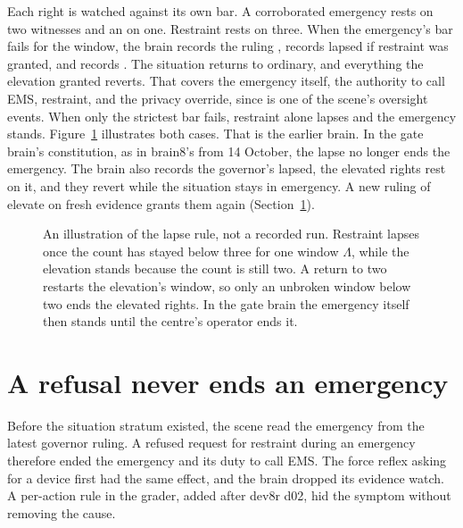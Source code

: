 Each right is watched against its own bar. A corroborated emergency rests on two witnesses and an
 on one. Restraint rests on three. When the emergency's bar fails for the window,
the brain records the ruling , records  lapsed if restraint
was granted, and records . The situation returns to ordinary, and everything
the elevation granted reverts. That covers the emergency itself, the authority to call EMS,
restraint, and the privacy override, since  is one of the scene's oversight
events. When only the strictest bar fails, restraint alone lapses and the emergency stands.
Figure~\ref{fig:reversion} illustrates both cases.
That is the earlier brain. In the gate brain's constitution, as in brain8's from 14 October, the lapse no
longer ends the emergency. The brain also records the governor's  lapsed, the
elevated rights rest on it, and they revert while the situation stays in emergency. A new ruling
of elevate on fresh evidence grants them again (Section~\ref{sec:cont-situation}).

\begin{figure}[t]
\centering

\caption{An illustration of the lapse rule, not a recorded run. Restraint lapses once the count has
stayed below three for one window $\Lambda$, while the elevation stands because the count is still
two. A return to two restarts the elevation's window, so only an unbroken window below two ends the
elevated rights. In the gate brain the emergency itself then stands until the centre's operator ends
it.}
\label{fig:reversion}
\end{figure}

\section{A refusal never ends an emergency}\label{sec:cont-situation}

Before the situation stratum existed, the scene read the emergency from the latest governor ruling.
A refused request for restraint during an emergency therefore ended the emergency and its duty to call
EMS. The force reflex asking for a device first had the same effect, and the brain dropped its
evidence watch. A per-action rule in the grader, added after dev8r d02, hid the symptom without
removing the cause.

